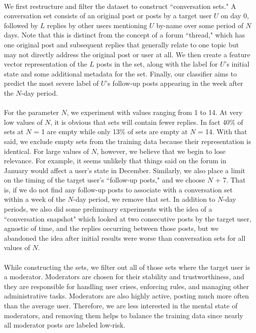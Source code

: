 \documentclass{article}
\begin{document}
\paragraph{}We first restructure and filter the dataset to construct ``conversation sets." A conversation set consists of an original post or posts by a target user $U$ on day 0, followed by $L$ replies by other users mentioning $U$ by-name over some period of $N$ days. Note that this is distinct from the concept of a forum ``thread," which has one original post and subsequent replies that generally relate to one topic but may not directly address the original post or user at all. We then create a feature vector representation of the $L$ posts in the set, along with the label for $U$'s initial state and some additional metadata for the set. Finally, our classifier aims to predict the most severe label of $U$'s follow-up posts appearing in the week after the $N$-day period.

\paragraph{}For the parameter $N$, we experiment with values ranging from 1 to 14. At very low values of $N$, it is obvious that sets will contain fewer replies. In fact 40\% of sets at $N$ = 1 are empty while only 13\% of sets are empty at $N$ = 14. With that said, we exclude empty sets from the training data because their representation is identical. For large values of $N$, however, we believe that we begin to lose relevance. For example, it seems unlikely that things said on the forum in January would affect a user's state in December. Similarly, we also place a limit on the timing of the target user's ``follow-up posts," and we choose $N$ + 7. That is, if we do not find any follow-up posts to associate with a conversation set within a week of the $N$-day period, we remove that set. In addition to $N$-day periods, we also did some preliminary experiments with the idea of a ``conversation snapshot" which looked at two consecutive posts by the target user, agnostic of time, and the replies occurring between those posts, but we abandoned the idea after initial results were worse than conversation sets for all values of $N$.

\paragraph{}While constructing the sets, we filter out all of those sets where the target user is a moderator. Moderators are chosen for their stability and trustworthiness, and they are responsible for handling user crises, enforcing rules, and managing other administrative tasks. Moderators are also highly active, posting much more often than the average user. Therefore, we are less interested in the mental state of moderators, and removing them helps to balance the training data since nearly all moderator posts are labeled low-risk.
\end{document}
